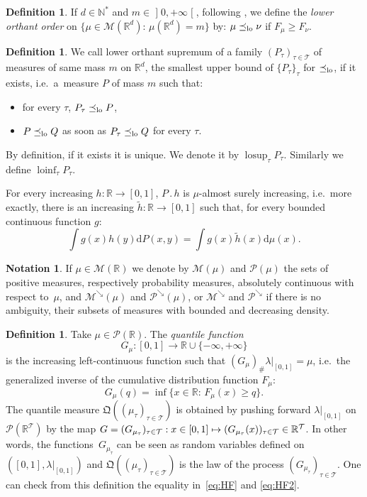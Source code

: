 \documentclass[10pt,a4paper]{article}
\providecommand{\ie}{i.e.\ }
\newcommand{\ldot}{\mathbin{.}}
\newcommand\mto{\mathchoice{\longmapsto}{\mapsto}{\mapsto}{\mapsto}}
\theoremstyle{plain}
\theoremstyle{definition}
\newtheorem{defi}[them]{Definition}
\newtheorem{notation}[them]{Notation} %
\newcommand{\dd}{\mathrm{d}}
\newcommand{\como}{\mathfrak{Q}}
\newcommand{\Tt}{{\mathcal T}}
\newcommand{\Lg}{\lambda|_{[0,1]}}
\newcommand{\p}{\mathcal{P}}
\newcommand{\m}{\mathcal{M}}
\newcommand{\R}{\mathbb{R}}
\newcommand{\N}{\mathbb{N}}
\newcommand{\lcsup}{\operatorname{losup}}
\newcommand{\lcinf}{\operatorname{loinf}}
\newcommand{\pdec}{\mathcal{P}^{\scriptscriptstyle\searrow}}
\newcommand{\mdec}{\mathcal{M}^{\scriptscriptstyle\searrow}}
\newcommand{\op}{\mathopen}
\newcommand{\clo}{\mathclose}
\newcommand{\leqlc}{\preceq_{\rm lo}}
\begin{document}
\begin{defi}\label{defi:geqlc} If $d\in\N^\ast$ and $m\in\op]0,+\infty\clo[$, following \cite[\S 6.G]{SS}, we define the \emph{lower orthant order} on $\{\mu\in\m(\R^d):\,\mu(\R^d)=m\}$ by: $\mu\leqlc\nu$ if $F_\mu\geqslant F_\nu$.
\end{defi}

\begin{defi}\label{def:lcsup}We call lower orthant supremum of a family $(P_\tau)_{\tau\in\Tt}$ of measures of same mass $m$ on $\R^d$, the smallest upper bound of $\{P_\tau\} _\tau$ for $\leqlc$, if it exists, \ie a~measure $P$ of mass $m$ such that:
\begin{itemize}
\item
for every $\tau$, $P_\tau\leqlc P$,
\item
$P\leqlc Q$ as soon as $P_\tau\leqlc Q$ for every $\tau$.
\end{itemize}
By definition, if it exists it is unique. We denote it by $\lcsup_\tau P_\tau$. Similarly we define $\lcinf_\tau P_\tau$.
\end{defi}

\label{pt:condexp} For every increasing $h:\R\to[0,1]$, $P\ldot h$ is $\mu$-almost surely increasing, \ie more exactly, there is an increasing $\tilde{h}:\R\to [0,1]$ such that, for every bounded continuous function $g$:
\[\int g(x)h(y) \dd P(x,y)= \int g(x)\tilde{h}(x)\dd \mu(x).\]

\begin{notation}\label{notation:mdec}
If $\mu\in\m(\R)$ we denote by $\m(\mu)$ and $\p(\mu)$ the sets of positive measures, respectively probability measures, absolutely continuous with respect to~$\mu$, and $\mdec(\mu)$ and $\pdec(\mu)$, or $\mdec$ and $\pdec$ if there is no ambiguity, their subsets of measures with bounded and decreasing density.
\end{notation}

\begin{defi}\label{defi:quantile2} Take $\mu\in \p(\R)$. The \emph{quantile function}
\[
G_\mu:[0,1]\to \R\cup\{-\infty,+\infty\}
\]
is the increasing left-continuous function such that $(G_\mu)_\#\Lg=\mu$, \ie the generalized inverse of the cumulative distribution function $F_\mu$:
\[G_\mu(q)=\inf\{x\in\R:\,F_\mu (x)\geq q\}.\]
The quantile measure $\como((\mu_\tau)_{\tau\in\Tt})$ is obtained by pushing forward $\Lg$ on $\p(\R^{\Tt})$ by the map $G=(G_{\mu_\tau})_{\tau\in \Tt}:x\in [0,1]\mto (G_{\mu_{\tau}}(x))_{\tau\in\Tt}\in \R^{\Tt}$.
In other words, the functions~$G_{\mu_{\tau}}$ can be seen as random variables defined on $([0,1],\Lg)$ and $\como((\mu_\tau)_{\tau\in\Tt})$ is the law of the process $(G_{\mu_{\tau}})_{\tau\in\Tt}$. One can check from this definition the equality in~\eqref{eq:HF} and \eqref{eq:HF2}.
\end{defi}
\end{document}

